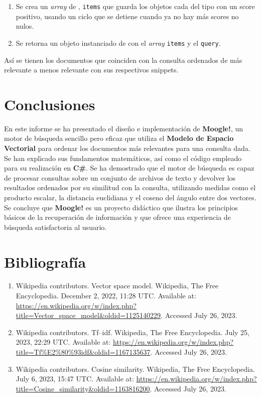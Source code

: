 \documentclass{article}
\begin{document}
\begin{itemize}
\begin{itemize}
\begin{enumerate}
\item Se crea un \textit{array} de , \texttt{items} que guarda los objetos cada del tipo  con un score positivo, usando un ciclo que se detiene cuando ya no hay más scores no nulos.
\item Se retorna un objeto instanciado de  con el \textit{array} \texttt{items} y el  \texttt{query}.
\end{enumerate}
Así se tienen los documentos que coinciden con la consulta ordenados de más relevante a menos relevante con sus respectivos snippets. 
\end{itemize} 
\end{itemize}
\section{Conclusiones} En este informe se ha presentado el diseño e implementación de \textbf{Moogle!}, un motor de búsqueda sencillo pero eficaz que utiliza el \textbf{Modelo de Espacio Vectorial} para ordenar los documentos más relevantes para una consulta dada. Se han explicado sus fundamentos matemáticos, así como el código empleado para su realización en \textbf{C\#}. Se ha demostrado que el motor de búsqueda es capaz de procesar consultas sobre un conjunto de archivos de texto y devolver los resultados ordenados por su similitud con la consulta, utilizando medidas como el producto escalar, la distancia euclidiana y el coseno del ángulo entre dos vectores. Se concluye que \textbf{Moogle!} es un proyecto didáctico que ilustra los principios básicos de la recuperación de información y que ofrece una experiencia de búsqueda satisfactoria al usuario.
\section{Bibliografía}
\begin{enumerate}
\item Wikipedia contributors. Vector space model. Wikipedia, The Free Encyclopedia. December 2, 2022, 11:28 UTC. Available at: \url{https://en.wikipedia.org/w/index.php?title=Vector_space_model&oldid=1125140229}. Accessed July 26, 2023.
\item Wikipedia contributors. Tf–idf. Wikipedia, The Free Encyclopedia. July 25, 2023, 22:29 UTC. Available at: \url{https://en.wikipedia.org/w/index.php?title=Tf%E2%80%93idf&oldid=1167135637}. Accessed July 26, 2023.
\item Wikipedia contributors. Cosine similarity. Wikipedia, The Free Encyclopedia. July 6, 2023, 15:47 UTC. Available at: \url{https://en.wikipedia.org/w/index.php?title=Cosine_similarity&oldid=1163816200}. Accessed July 26, 2023.
\end{enumerate}
\end{document}
